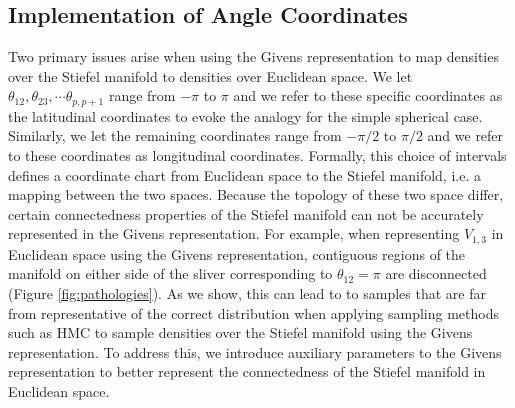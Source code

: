 \documentclass[ba]{imsart}
\numberwithin{equation}{section}
\theoremstyle{plain}
\begin{document}
\subsection{Implementation of Angle Coordinates}
Two primary issues arise when using the Givens representation to map densities over the Stiefel manifold to densities over Euclidean space. We let $\theta_{12}, \theta_{23}, \cdots \theta_{p,p+1}$ range from $-\pi$ to $\pi$ and we refer to these specific coordinates as the latitudinal coordinates to evoke the analogy for the simple spherical case. Similarly, we let the remaining coordinates range from $-\pi/2$ to $\pi/2$ and we refer to these coordinates as longitudinal coordinates. Formally, this choice of intervals defines a coordinate chart from Euclidean space to the Stiefel manifold, i.e. a mapping between the two spaces. Because the topology of these two space differ, certain connectedness properties of the Stiefel manifold can not be accurately represented in the Givens representation. For example, when representing $V_{1,3}$ in Euclidean space using the Givens representation, contiguous regions of the manifold on either side of the sliver corresponding to $\theta_{12} = \pi$ are disconnected (Figure \ref{fig:pathologies}). As we show, this can lead to to samples that are far from representative of the correct distribution when applying sampling methods such as HMC to sample densities over the Stiefel manifold using the Givens representation. To address this, we introduce auxiliary parameters to the Givens representation to better represent the connectedness of the Stiefel manifold in Euclidean space.
\end{document}
